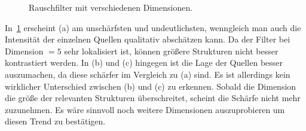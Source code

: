 \documentclass[slug=PET, room=Andreas-Schubert-Bau\,\ 424A,
supervisor=Carsten\ Bittrich, coursedate=10.\ 01.\ 2020, ngerman]{../../Lab_Report_LaTeX/lab_report}
\begin{document}
\begin{figure}[h!]
        \centering
        \caption{Rauschfilter mit verschiedenen Dimensionen.}
        \label{fig:rausch}
\end{figure}

In~\ref{fig:rausch} erscheint (a) am unschärfsten und undeutlichsten,
wenngleich man auch die Intensität der einzelnen Quellen qualitativ
abschätzen kann. Da der Filter bei Dimension \(=5\) sehr lokalisiert
ist, k\"onnen gr\"o\ss{}ere Strukturen nicht besser kontrastiert
werden. In (b) und (c) hingegen ist die Lage der Quellen besser
auszumachen, da diese schärfer im Vergleich zu (a) sind. Es ist
allerdings kein wirklicher Unterschied zwischen (b) und (c) zu
erkennen. Sobald die Dimension die gr\"o\ss{}e der relevanten
Strukturen \"uberschreitet, scheint die Sch\"arfe nicht mehr
zuzunehmen. Es w\"are sinnvoll noch weitere Dimensionen auszuprobieren
um diesen Trend zu best\"atigen.
\end{document}
